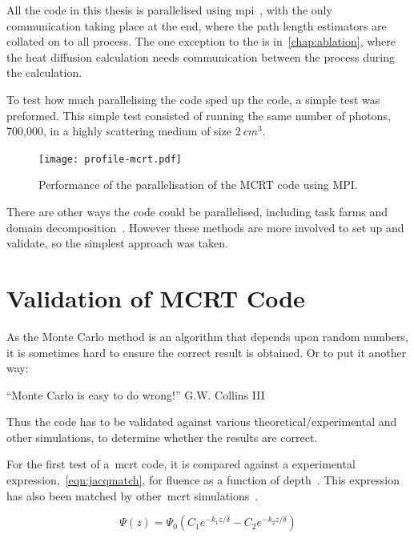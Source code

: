 All the code in this thesis is parallelised using \gls*{mpi}~\cite{gropp2014using,gropp2014usingadv}, with the only communication taking place at the end, where the path length estimators are collated on to all process.
The one exception to the is in~\cref{chap:ablation}, where the heat diffusion calculation needs communication between the process during the calculation.

To test how much parallelising the code sped up the code, a simple test was preformed.
This simple test consisted of running the same number of photons, 700,000, in a highly scattering medium of size $2~cm^3$.


\begin{figure}[!ht]
	\centering
	\texttt{[image: profile-mcrt.pdf]}
	\caption{Performance of the parallelisation of the MCRT code using MPI.}
	\label{fig:paratest}
\end{figure}


There are other ways the code could be parallelised, including task farms and domain decomposition~\cite{barney2010introduction}.
However these methods are more involved to set up and validate, so the simplest approach was taken.
\FloatBarrier
\section{Validation of MCRT Code}\label{sec:validation}

As the Monte Carlo method is an algorithm that depends upon random numbers, it is sometimes hard to ensure the correct result is obtained.
Or to put it another way:
\medskip

``Monte Carlo is easy to do wrong!'' G.W. Collins III~\cite{bjormaneasymonte}

\medskip

Thus the code has to be validated against various theoretical/experimental and other simulations, to determine whether the results are correct.

For the first test of a~\gls*{mcrt} code, it is compared against a experimental expression,~\cref{eqn:jacqmatch}, for fluence as a function of depth~\cite{gardner1993fluorescence}.
This expression has also been matched by other~\gls*{mcrt} simulations~\cite{jacques1993photobleaching}.

\begin{equation}
\Psi(z)=\Psi_0(C_1e^{-k_1z/\delta}-C_2e^{-k_2z/\delta})
\label{eqn:jacqmatch}
\end{equation}

